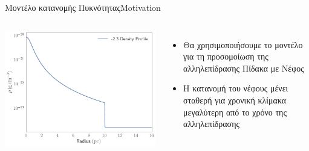 \documentclass{beamer}
\begin{document}
\begin{frame}{Μοντέλο κατανομής Πυκνότητας}{Motivation}
	\begin{columns}
			\begin{center}
				\includegraphics[width=1\linewidth]{../Document/DataImages/SimRHOProfile}
			\end{center}
		\begin{itemize}
			\item{Θα χρησιμοποιήσουμε το μοντέλο για τη προσομοίωση της αλληλεπίδρασης Πίδακα με Νέφος}
			\item{Η κατανομή του νέφους μένει σταθερή για χρονική κλίμακα μεγαλύτερη από το χρόνο της αλληλεπίδρασης}
		\end{itemize}
	\end{columns}
\end{frame}
\end{document}
